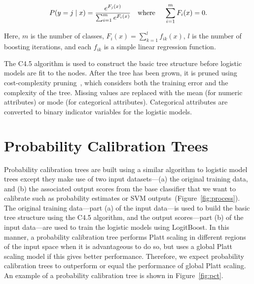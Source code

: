\documentclass[wcp]{jmlr}
\begin{document}
\begin{equation}	\label{eqn:logistic}
	P(y=j\mid x) = \frac{e^{F_j(x)}}{\sum_{i=1}^{m} e^{F_i(x)}} \textrm{\quad where \quad} \sum_{i=1}^{m} F_i(x) = 0.
\end{equation}

\noindent Here, $m$ is the number of classes, $F_i(x) = \sum_{k=1}^l f_{ik}(x)$, $l$ is the number of boosting iterations, and each $f_{ik}$ is a simple linear regression function. 

The C4.5 algorithm is used to construct the basic tree structure before logistic models are fit to the nodes. After the tree has been grown, it is pruned using cost-complexity pruning~\citep{breiman1984classification}, which considers both the training error and the complexity of the tree. Missing values are replaced with the mean (for numeric attributes) or mode (for categorical attributes). Categorical attributes are converted to binary indicator variables for the logistic models.

\section{\label{sec:probability_calibration_trees}Probability Calibration Trees}

Probability calibration trees are built using a similar algorithm to logistic model trees except they make use of two input datasets---(a) the original training data, and (b) the associated output scores from the base classifier that we want to calibrate such as probability estimates or SVM outputs~(Figure~\ref{fig:process}). The original training data---part (a) of the input data---is used to build the basic tree structure using the C4.5 algorithm, and the output scores---part (b) of the input data---are used to train the logistic models using LogitBoost. In this manner, a probability calibration tree performs Platt scaling in different regions of the input space when it is advantageous to do so, but uses a global Platt scaling model if this gives better performance. Therefore, we expect probability calibration trees to outperform or equal the performance of global Platt scaling. 
An example of a probability calibration tree is shown in Figure~\ref{fig:pct}. 
\end{document}
